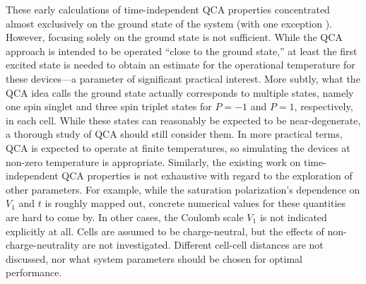 These early calculations of time-independent QCA properties concentrated almost
exclusively on the ground state of the system (with one exception
\cite{tougaw1993bistable}). However, focusing solely on the ground state is not
sufficient. While the QCA approach is intended to be operated ``close to the
ground state,'' at least the first excited state is needed to obtain an estimate
for the operational temperature for these devices---a parameter of significant
practical interest. More subtly, what the QCA idea calls the ground state
actually corresponds to multiple states, namely one spin singlet and three spin
triplet states for $P=-1$ and $P=1$, respectively, in each cell. While these
states can reasonably be expected to be near-degenerate, a thorough study of QCA
should still consider them. In more practical terms, QCA is expected to operate
at finite temperatures, so simulating the devices at non-zero temperature is
appropriate. Similarly, the existing work on time-independent QCA properties is
not exhaustive with regard to the exploration of other parameters. For example,
while the saturation polarization's dependence on $V_1$ and $t$ is roughly
mapped out, concrete numerical values for these quantities are hard to come by.
In other cases, the Coulomb scale $V_1$ is not indicated explicitly at all.
Cells are assumed to be charge-neutral, but the effects of non-charge-neutrality
are not investigated.  Different cell-cell distances are not discussed, nor what
system parameters should be chosen for optimal performance.


